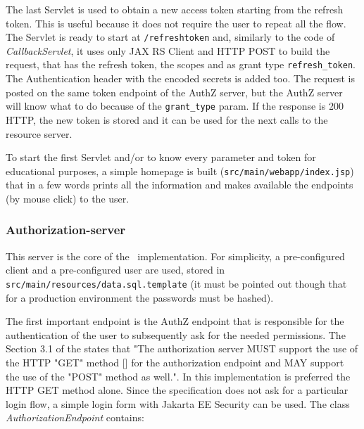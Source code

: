 The last Servlet is used to obtain a new access token starting from the refresh token. This is useful because it does not require the user to repeat all the flow. The Servlet is ready to start at \texttt{/refreshtoken} and, similarly to the code of \textit{CallbackServlet}, it uses only JAX RS Client and HTTP POST to build the request, that has the refresh token, the scopes and as grant type \texttt{refresh\_token}. The Authentication header with the encoded secrets is added too. The request is posted on the same token endpoint of the AuthZ server, but the AuthZ server will know what to do because of the \texttt{grant\_type} param. If the response is 200 HTTP, the new token is stored and it can be used for the next calls to the resource server.

To start the first Servlet and/or to know every parameter and token for educational purposes, a simple homepage is built (\texttt{src/main/webapp/index.jsp}) that in a few words prints all the information and makes available the endpoints (by mouse click) to the user.

\subsubsection{Authorization-server}
This server is the core of the \oauth\ implementation. For simplicity, a pre-configured client and a pre-configured user are used, stored in \texttt{src/main/resources/data.sql.template} (it must be pointed out though that for a production environment the passwords must be hashed). 

The first important endpoint is the AuthZ endpoint that is responsible for the authentication of the user to subsequently ask for the needed permissions. The Section 3.1 of the  states that "The authorization server MUST support the use of the HTTP "GET" method [] for the authorization endpoint and MAY support the use of the "POST" method as well.". In this implementation is preferred the HTTP GET method alone. Since the specification does not ask for a particular login flow, a simple login form with Jakarta EE Security can be used. The class \textit{AuthorizationEndpoint} contains:

